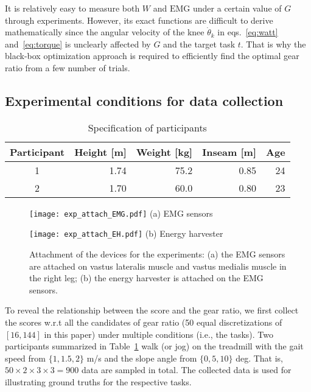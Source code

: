 \documentclass[twocolumn]{svjour3}          %
\begin{document}
It is relatively easy to measure both $W$ and $\mathrm{EMG}$ under a certain value of $G$ through experiments.
However, its exact functions are difficult to derive mathematically since the angular velocity of the knee $\dot{\theta}_k$ in eqs.~\eqref{eq:watt} and~\eqref{eq:torque} is unclearly affected by $G$ and the target task $t$.
That is why the black-box optimization approach is required to efficiently find the optimal gear ratio from a few number of trials.

\subsection{Experimental conditions for data collection}

\begin{table}[tb]
    \centering
    \small
    \caption{Specification of participants}
    \begin{tabular}{ c r r r r }
        \hline
        Participant & Height [m] & Weight [kg] &  Inseam [m]& Age
        \\ \hline
        1 & 1.74 & 75.2 & 0.85 & 24
        \\
        2 & 1.70 & 60.0 & 0.80 & 23
        \\ \hline
    \end{tabular}
    \label{tab:params_participant}
\end{table}

\begin{figure}[tb]
    \centering
    \begin{minipage}{0.49\linewidth}
        \centering
        \texttt{[image: exp\_attach\_EMG.pdf]}
        {(a) EMG sensors}
    \end{minipage}
    \begin{minipage}{0.49\linewidth}
        \centering
        \texttt{[image: exp\_attach\_EH.pdf]}
        {(b) Energy harvester}
    \end{minipage}
    \caption{Attachment of the devices for the experiments:
    (a) the EMG sensors are attached on vastus lateralis muscle and vastus medialis muscle in the right leg;
    (b) the energy harvester is attached on the EMG sensors.
    }
    \label{fig:exp_attach}
\end{figure}

To reveal the relationship between the score and the gear ratio, we first collect the scores w.r.t all the candidates of gear ratio (50 equal discretizations of $[16, 144]$ in this paper) under multiple conditions (i.e., the tasks).
Two participants summarized in Table~\ref{tab:params_participant} walk (or jog) on the treadmill with the gait speed from $\{1, 1.5, 2\}$ m/s and the slope angle from $\{0, 5, 10\}$ deg.
That is, $50 \times 2 \times 3 \times 3 = 900$ data are sampled in total.
The collected data is used for illustrating ground truths for the respective tasks.
\end{document}
